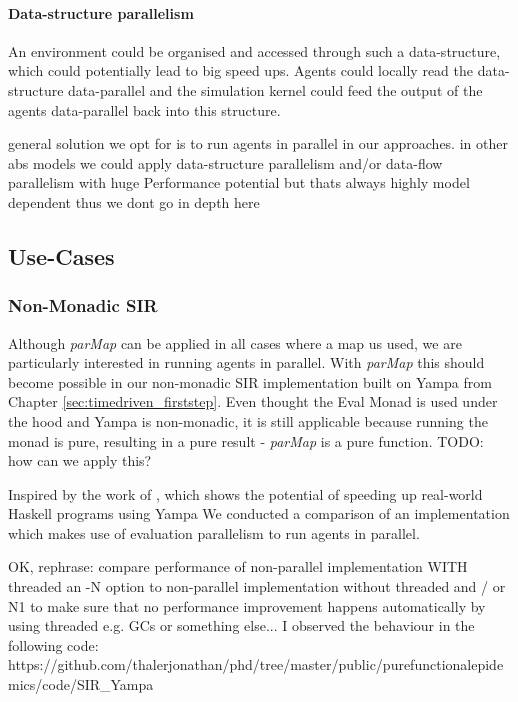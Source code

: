 \paragraph{Data-structure parallelism}
An environment could be organised and accessed through such a data-structure, which could potentially lead to big speed ups. Agents could locally read the data-structure data-parallel and the simulation kernel could feed the output of the agents data-parallel back into this structure.


general solution we opt for is  to run agents in parallel in our approaches. in other abs models we could apply data-structure parallelism and/or data-flow parallelism with huge Performance potential but thats always highly model dependent thus we dont go in depth here

\subsection{Use-Cases}

\subsubsection{Non-Monadic SIR}
Although \textit{parMap} can be applied in all cases where a map us used, we are particularly interested in running agents in parallel. With \textit{parMap} this should become possible in our non-monadic SIR implementation built on Yampa from Chapter \ref{sec:timedriven_firststep}. Even thought the Eval Monad is used under the hood and Yampa is non-monadic, it is still applicable because running the monad is pure, resulting in a pure result - \textit{parMap} is a pure function. TODO: how can we apply this?

Inspired by the work of \cite{perez_60_2014}, which shows the potential of speeding up real-world Haskell programs using Yampa We conducted a comparison of an implementation which makes use of evaluation parallelism to run agents in parallel.

OK, rephrase: compare performance of non-parallel implementation WITH threaded an -N option to non-parallel implementation without threaded and / or N1 to make sure that no performance improvement happens automatically by using threaded e.g. GCs or something else...
I observed the behaviour in the following code: https://github.com/thalerjonathan/phd/tree/master/public/purefunctionalepidemics/code/SIR_Yampa

